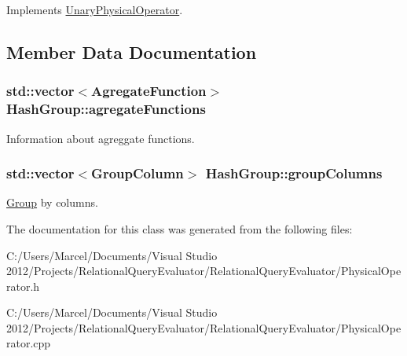 Implements \hyperlink{class_unary_physical_operator_a3b0160d380149213561ef2ba479dbf6a}{Unary\+Physical\+Operator}.



\subsection{Member Data Documentation}
\hypertarget{class_hash_group_a8a813f6713413f2bd401bfa77be774de}{
\subsubsection[{agregate\+Functions}]{\setlength{\rightskip}{0pt plus 5cm}std\+::vector$<${\bf Agregate\+Function}$>$ Hash\+Group\+::agregate\+Functions}}\label{class_hash_group_a8a813f6713413f2bd401bfa77be774de}
Information about agreggate functions. \hypertarget{class_hash_group_a61af9515cad55af148210493431c5df6}{
\subsubsection[{group\+Columns}]{\setlength{\rightskip}{0pt plus 5cm}std\+::vector$<${\bf Group\+Column}$>$ Hash\+Group\+::group\+Columns}}\label{class_hash_group_a61af9515cad55af148210493431c5df6}
\hyperlink{class_group}{Group} by columns. 

The documentation for this class was generated from the following files\+:\begin{DoxyCompactItemize}
\item 
C\+:/\+Users/\+Marcel/\+Documents/\+Visual Studio 2012/\+Projects/\+Relational\+Query\+Evaluator/\+Relational\+Query\+Evaluator/Physical\+Operator.\+h\item 
C\+:/\+Users/\+Marcel/\+Documents/\+Visual Studio 2012/\+Projects/\+Relational\+Query\+Evaluator/\+Relational\+Query\+Evaluator/Physical\+Operator.\+cpp\end{DoxyCompactItemize}
